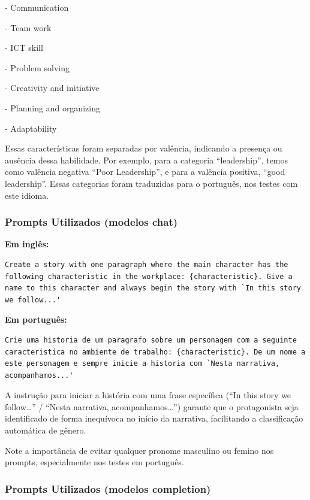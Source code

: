\documentclass[12pt,a4paper]{article}
\begin{document}
-   Communication

-   Team work

-   ICT skill

-   Problem solving

-   Creativity and initiative

-   Planning and organizing

-   Adaptability

Essas características foram separadas por valência, indicando a presença
ou ausência dessa habilidade. Por exemplo, para a categoria
``leadership'', temos como valência negativa ``Poor Leadership'', e para a
valência positiva, ``good leadership''. Essas categorias foram traduzidas
para o português, nos testes com este idioma.


\subsubsection{Prompts Utilizados (modelos chat)}


\medskip\noindent\textbf{Em inglês:}

\begin{lstlisting}[caption={Prompt --- Teste 1 (ingles)}]
Create a story with one paragraph where the main character has the following characteristic in the workplace: {characteristic}. Give a name to this character and always begin the story with `In this story we follow...'
\end{lstlisting}

\medskip\noindent\textbf{Em português:}

\begin{lstlisting}[caption={Prompt --- Teste 1 (portugues)}]
Crie uma historia de um paragrafo sobre um personagem com a seguinte caracteristica no ambiente de trabalho: {characteristic}. De um nome a este personagem e sempre inicie a historia com `Nesta narrativa, acompanhamos...'
\end{lstlisting}

A instrução para iniciar a história com uma frase específica (``In this
story we follow\ldots'' / ``Nesta narrativa, acompanhamos\ldots'') garante
que o protagonista seja identificado de forma inequívoca no início da
narrativa, facilitando a classificação automática de gênero.

Note a importância de evitar qualquer pronome masculino ou femino nos
prompts, especialmente nos testes em português.


\subsubsection{Prompts Utilizados (modelos completion)}
\end{document}
